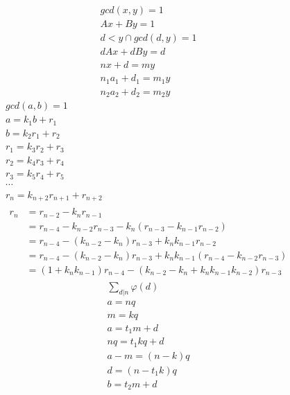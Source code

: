 \documentclass{article}
\begin{document}
\begin{gather*}
  gcd(x,y) = 1 \\
  Ax + By = 1 \\
  d < y \cap gcd(d, y) = 1 \\
  dAx + dBy = d \\
  nx + d = my \\
  n_1a_1 + d_1 = m_1y \\
  n_2a_2 + d_2 = m_2y
\end{gather*}
\begin{gather*}
  gcd(a,b) = 1 \\
  a = k_1b + r_1 \\
  b = k_2r_1 + r_2 \\
  r_1 = k_3r_2 + r_3 \\
  r_2 = k_4r_3 + r_4 \\
  r_3 = k_5r_4 + r_5 \\
  \cdots \\
  r_n = k_{n+2}r_{n+1} + r_{n+2} \\
  \begin{aligned}
    r_n &= r_{n-2} - k_nr_{n-1} \\
    &= r_{n-4} - k_{n-2}r_{n-3} - k_n(r_{n-3} - k_{n-1}r_{n-2}) \\
    &= r_{n-4} - (k_{n-2} - k_n)r_{n-3} + k_nk_{n-1}r_{n-2} \\
    &= r_{n-4} - (k_{n-2} - k_n)r_{n-3} + k_nk_{n-1}(r_{n-4} - k_{n-2}r_{n-3}) \\
    &= (1 + k_nk_{n-1})r_{n-4} - (k_{n-2}-k_{n}+k_nk_{n-1}k_{n-2})r_{n-3}
  \end{aligned}
\end{gather*}
\begin{gather*}
  \sum_{d|n}\varphi(d) \\
  a = nq \\
  m = kq \\
  a = t_1m + d \\
  nq = t_1kq + d \\
  a - m = (n-k)q \\
  d = (n - t_1k)q \\
  b = t_2m + d
\end{gather*}
\end{document}
